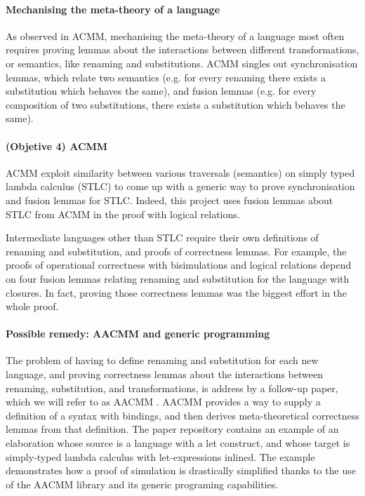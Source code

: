 \documentclass[bsc,frontabs,oneside,singlespacing,parskip,deptreport]{infthesis}
\theoremstyle{definition}
\theoremstyle{lemma}
\begin{document}
\paragraph{Mechanising the meta-theory of a language}
As observed in ACMM, mechanising the meta-theory of a language most
often requires proving lemmas about the interactions between different
transformations, or semantics, like renaming and substitutions. ACMM
singles out synchronisation lemmas, which relate two semantics
(e.g. for every renaming there exists a substitution which behaves the
same), and fusion lemmas (e.g. for every composition of two
substitutions, there exists a substitution which behaves the
same). 

\paragraph{(Objetive 4) ACMM}
ACMM exploit similarity between various traversals (semantics) on
simply typed lambda calculus (STLC) to come up with a generic way to
prove synchronisation and fusion lemmas for STLC. Indeed, this project
uses fusion lemmas about STLC from ACMM in the proof with logical
relations.

Intermediate languages other than STLC require their own definitions
of renaming and substitution, and proofs of correctness lemmas. For
example, the proofs of operational correctness with bisimulations and
logical relations depend on four fusion lemmas relating renaming and
substitution for the language with closures. In fact, proving those
correctness lemmas was the biggest effort in the whole proof.

\paragraph{Possible remedy: AACMM and generic programming}
The problem of having to define renaming and substitution for each new
language, and proving correctness lemmas about the interactions
between renaming, substitution, and transformations, is address by a
follow-up paper, which we will refer to as AACMM
\cite{DBLP:journals/pacmpl/AllaisA0MM18}. AACMM provides a way to
supply a definition of a syntax with bindings, and then derives
meta-theoretical correctness lemmas from that definition. The paper
repository contains an example of an elaboration whose source is a
language with a let construct, and whose target is simply-typed lambda
calculus with let-expressions inlined. The example demonstrates how a
proof of simulation is drastically simplified thanks to the use of the
AACMM library and its generic programing capabilities.
\end{document}
